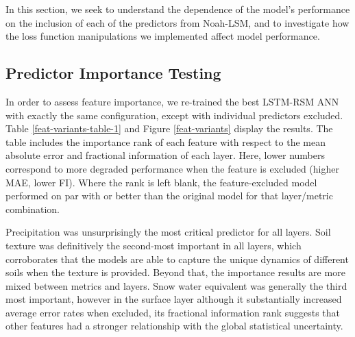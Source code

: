 \noindent
In this section, we seek to understand the dependence of the model's performance on the inclusion of each of the predictors from Noah-LSM, and to investigate how the loss function manipulations we implemented affect model performance.

\subsection{Predictor Importance Testing}

In order to assess feature importance, we re-trained the best LSTM-RSM ANN with exactly the same configuration, except with individual predictors excluded. Table \ref{feat-variants-table-1} and Figure \ref{feat-variants} display the results. The table includes the importance rank of each feature with respect to the mean absolute error and fractional information of each layer. Here, lower numbers correspond to more degraded performance when the feature is excluded (higher MAE, lower FI). Where the rank is left blank, the feature-excluded model performed on par with or better than the original model for that layer/metric combination.

Precipitation was unsurprisingly the most critical predictor for all layers. Soil texture was definitively the second-most important in all layers, which corroborates that the models are able to capture the unique dynamics of different soils when the texture is provided. Beyond that, the importance results are more mixed between metrics and layers. Snow water equivalent was generally the third most important, however in the surface layer although it substantially increased average error rates when excluded, its fractional information rank suggests that other features had a stronger relationship with the global statistical uncertainty.

